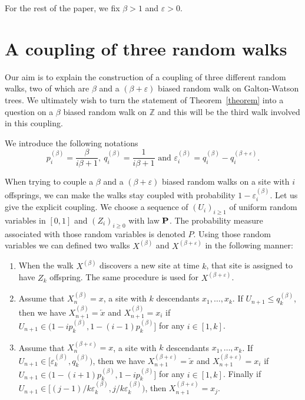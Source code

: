 \documentclass[12pt]{amsart}
\numberwithin{equation}{section}
\begin{document}
For the rest of the paper, we fix $\beta>1$ and ${\varepsilon}>0$. 

\section{A coupling of three random walks}

Our aim is to explain the construction of a coupling of three different random walks, two of which are $\beta$ and a $(\beta+{\varepsilon})$ biased random walk on Galton-Watson trees. We ultimately wish to turn the statement of Theorem~\ref{theorem} into a question on a $\beta$ biased random walk on ${\mathbb{Z}}$ and this will be the third walk involved in this coupling.

We introduce the following notations 
\[
p_i^{(\beta)}=\frac{\beta}{i\beta+1},\ q_i^{(\beta)}=\frac 1{i\beta+1}\text{ and }{\varepsilon}_i^{(\beta)}=q_i^{(\beta)}-q_i^{(\beta+{\varepsilon})}. 
\]

When trying to couple a $\beta$ and a $(\beta+{\varepsilon})$ biased random walks on a site with $i$ offsprings, we can make the walks stay coupled with probability $1-{\varepsilon}_i^{(\beta)}$. Let us give the explicit coupling. We choose a sequence of $(U_i)_{i\geq 1}$ of uniform random variables in $[0,1]$  and $(Z_i)_{i\geq 0}$ with law ${\bf P}$. The probability measure associated with those random variables is denoted $P$. Using those random variables we can defined two walks $X^{(\beta)}$ and $X^{(\beta+{\varepsilon})}$ in the following manner: 
\begin{enumerate}
\item When the walk $X^{(\beta)}$ discovers a new site at time $k$, that site is assigned to have $Z_k$ offspring. The same procedure is used for $X^{(\beta+{\varepsilon})}$.
\item Assume that $X^{(\beta)}_n=x$, a site with $k$ descendants $x_1,\ldots, x_k$. If $U_{n+1}\leq q_k^{(\beta)}$, then we have $X^{(\beta)}_{n+1}=\overleftarrow{x}$ and $X^{(\beta)}_{n+1}=x_i$ if $U_{n+1}\in (1-ip_k^{(\beta)},1-(i-1) p_k^{(\beta)}]$ for any $i\in [1,k]$.
\item Assume that $X^{(\beta+{\varepsilon})}_n=x$, a site with $k$ descendants $x_1,\ldots, x_k$. If $U_{n+1}\in [{\varepsilon}_k^{(\beta)},q_k^{(\beta)})$, then we have $X^{(\beta+{\varepsilon})}_{n+1}=\overleftarrow{x}$ and $X^{(\beta+{\varepsilon})}_{n+1}=x_i$ if $U_{n+1}\in (1-(i+1)p_k^{(\beta)},1-i p_k^{(\beta)}]$ for any $i\in [1,k]$. Finally if $U_{n+1}\in [(j-1)/k{\varepsilon}_k^{(\beta)},j/k{\varepsilon}_k^{(\beta)})$, then $X^{(\beta+{\varepsilon})}_{n+1}=x_j$.
\end{enumerate}
\end{document}
